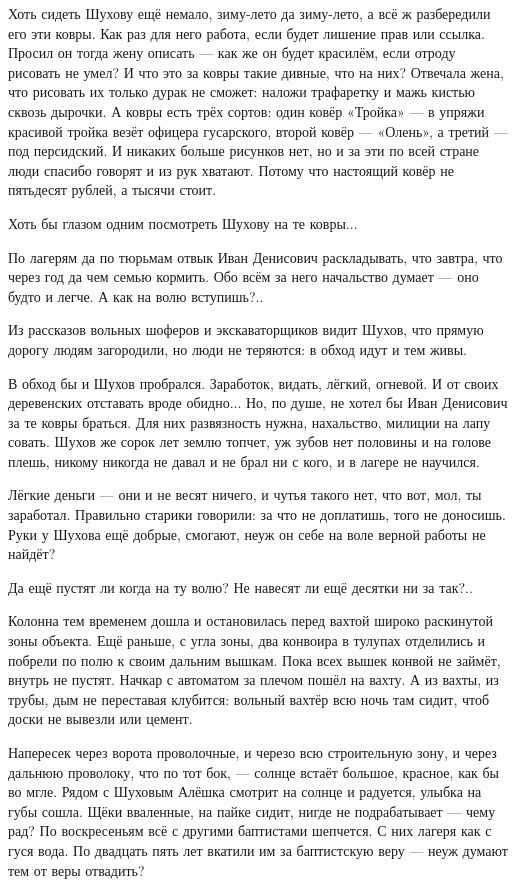 Хоть сидеть Шухову ещё немало, зиму-лето да зиму-лето, а всё ж разбередили его эти ковры. Как
раз для него работа, если будет лишение прав или ссылка. Просил он тогда жену описать --- как
же он будет красилём, если отроду рисовать не умел? И что это за ковры такие дивные, что на
них? Отвечала жена, что рисовать их только дурак не сможет: наложи трафаретку и мажь кистью
сквозь дырочки. А ковры есть трёх сортов: один ковёр «Тройка» --- в упряжи красивой тройка
везёт офицера гусарского, второй ковёр --- «Олень», а третий --- под персидский. И никаких
больше рисунков нет, но и за эти по всей стране люди спасибо говорят и из рук хватают. Потому
что настоящий ковёр не пятьдесят рублей, а тысячи стоит.

Хоть бы глазом одним посмотреть Шухову на те ковры...

По лагерям да по тюрьмам отвык Иван Денисович раскладывать, что завтра, что через год да чем
семью кормить. Обо всём за него начальство думает --- оно будто и легче. А как на волю
вступишь?..

Из рассказов вольных шоферов и экскаваторщиков видит Шухов, что прямую дорогу людям
загородили, но люди не теряются: в обход идут и тем живы.

В обход бы и Шухов пробрался. Заработок, видать, лёгкий, огневой. И от своих деревенских
отставать вроде обидно... Но, по душе, не хотел бы Иван Денисович за те ковры браться. Для них
развязность нужна, нахальство, милиции на лапу совать. Шухов же сорок лет землю топчет, уж
зубов нет половины и на голове плешь, никому никогда не давал и не брал ни с кого, и в лагере
не научился.

Лёгкие деньги --- они и не весят ничего, и чутья такого нет, что вот, мол, ты заработал.
Правильно старики говорили: за что не доплатишь, того не доносишь. Руки у Шухова ещё добрые,
смогают, неуж он себе на воле верной работы не найдёт?

Да ещё пустят ли когда на ту волю? Не навесят ли ещё десятки ни за так?..

Колонна тем временем дошла и остановилась перед вахтой широко раскинутой зоны объекта. Ещё
раньше, с угла зоны, два конвоира в тулупах отделились и побрели по полю к своим дальним
вышкам. Пока всех вышек конвой не займёт, внутрь не пустят. Начкар с автоматом за плечом
пошёл на вахту. А из вахты, из трубы, дым не переставая клубится: вольный вахтёр всю ночь там
сидит, чтоб доски не вывезли или цемент.

Напересек через ворота проволочные, и черезо всю строительную зону, и через дальнюю
проволоку, что по тот бок, --- солнце встаёт большое, красное, как бы во мгле. Рядом с Шуховым
Алёшка смотрит на солнце и радуется, улыбка на губы сошла. Щёки вваленные, на пайке сидит,
нигде не подрабатывает --- чему рад? По воскресеньям всё с другими баптистами шепчется. С них
лагеря как с гуся вода. По двадцать пять лет вкатили им за баптистскую веру --- неуж думают тем
от веры отвадить?

